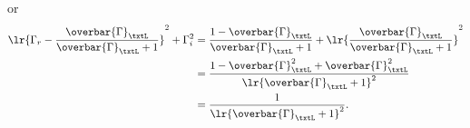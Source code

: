 {or
\begin{equation}\label{eqn:uwavesDeck5SmithChartCore:560}
\begin{aligned}
\lr{ \Gamma_r - \frac{ \overbar{\Gamma}_\txtL }{\overbar{\Gamma}_\txtL + 1} }^2 + \Gamma_i^2
&=
\frac{1 - \overbar{\Gamma}_\txtL}{ \overbar{\Gamma}_\txtL + 1} + \lr{ \frac{ \overbar{\Gamma}_\txtL }{\overbar{\Gamma}_\txtL + 1} }^2
\\ &=
\frac{ 1 - \overbar{\Gamma}_\txtL^2 + \overbar{\Gamma}_\txtL^2 }{\lr{\overbar{\Gamma}_\txtL + 1}^2}
\\ &=
\frac{ 1 }{\lr{\overbar{\Gamma}_\txtL + 1}^2}.
\end{aligned}
\end{equation}

} %
